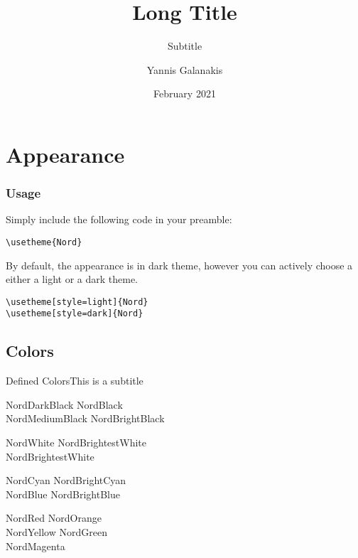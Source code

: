 \documentclass[compress,aspectratio=169, table]{beamer}
\title[ShortTitle]{Long Title}
\subtitle{Subtitle}
\author{Yannis Galanakis}
\institute{University of Kent}
\date{February 2021}
\begin{document}
\begin{frame}
  \maketitle
\end{frame}


\section{Appearance}

\begin{frame}[fragile]
  \frametitle{Usage}
  Simply include the following code in your preamble:

  \begin{lstlisting}[basicstyle = \ttfamily\small]
\usetheme{Nord}
  \end{lstlisting}

  \bigskip

  By default, the appearance is in dark theme, however you can actively choose a either a light or a
  dark theme.

  \begin{lstlisting}[basicstyle = \ttfamily\small]
\usetheme[style=light]{Nord}
\usetheme[style=dark]{Nord}
  \end{lstlisting}

\end{frame}

\subsection{Colors}

\begin{frame}{Defined Colors}{This is a subtitle}
  \begin{description}
  \item[Polar Night]
    \textcolor{NordDarkBlack}{NordDarkBlack} \quad \textcolor{NordBlack}{NordBlack}\\
    \textcolor{NordMediumBlack}{NordMediumBlack} \quad \textcolor{NordBrightBlack}{NordBrightBlack}
  \item[Snow Storm]
    \textcolor{NordWhite}{NordWhite} \quad \textcolor{NordBrighterWhite}{NordBrightestWhite}\\
    \textcolor{NordBrightestWhite}{NordBrightestWhite}
  \item[Forest]
    \textcolor{NordCyan}{NordCyan} \quad \textcolor{NordBrightCyan}{NordBrightCyan}\\
    \textcolor{NordBlue}{NordBlue} \quad \textcolor{NordBrightBlue}{NordBrightBlue}
  \item[Aurora]
    \textcolor{NordRed}{NordRed} \quad \textcolor{NordOrange}{NordOrange} \\
    \textcolor{NordYellow}{NordYellow} \quad \textcolor{NordGreen}{NordGreen} \\
    \textcolor{NordMagenta}{NordMagenta}
  \end{description}
\end{frame}
\end{document}
